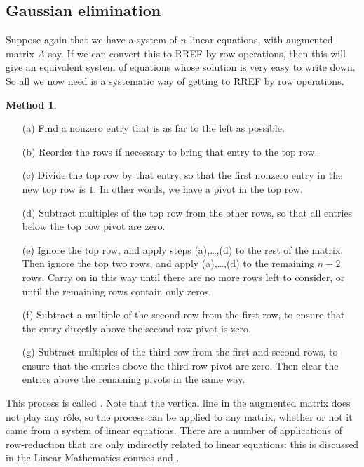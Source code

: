 \documentclass[a4paper]{book}
\theoremstyle{definition}
\newtheorem{method}[theorem]{Method}
\begin{document}
\subsection{Gaussian elimination}
\label{subsec-gauss}

Suppose again that we have a system of $n$ linear equations, with
augmented matrix $A$ say.  If we can convert this to RREF by row
operations, then this will give an equivalent system of equations
whose solution is very easy to write down.  So all we now need is a
systematic way of getting to RREF by row operations.  
\begin{method}
 \begin{itemize}
  \item[(a)] Find a nonzero entry that is as far to the left as possible.
  \item[(b)] Reorder the rows if necessary to bring that entry to the
   top row.
  \item[(c)] Divide the top row by that entry, so that the first
   nonzero entry in the new top row is $1$.  In other words, we have a
   pivot in the top row.
  \item[(d)] Subtract multiples of the top row from the other rows, so
   that all entries below the top row pivot are zero.
  \item[(e)] Ignore the top row, and apply steps (a),\ldots,(d) to the rest
   of the matrix.  Then ignore the top two rows, and apply
   (a),\ldots,(d) to the remaining $n-2$ rows.  Carry on in this way
   until there are no more rows left to consider, or until the
   remaining rows contain only zeros.
  \item[(f)] Subtract a multiple of the second row from the first row,
   to ensure that the entry directly above the second-row pivot is
   zero.
  \item[(g)] Subtract multiples of the third row from the first and
   second rows, to ensure that the entries above the third-row pivot
   are zero.  Then clear the entries above the remaining pivots in the
   same way.
 \end{itemize}
\end{method}
This process is called .  Note that the vertical
line in the augmented matrix does not play any r\^ole, so the process
can be applied to any matrix, whether or not it came from a system of
linear equations.  There are a number of applications of row-reduction
that are only indirectly related to linear equations: this is
discussed in the Linear Mathematics courses  and .
\end{document}
